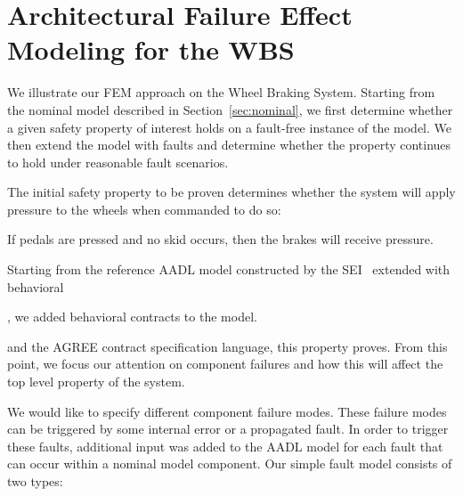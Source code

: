 \section{Architectural Failure Effect Modeling for the WBS}

We illustrate our FEM approach on the Wheel Braking System.  Starting from the nominal model described in Section~\ref{sec:nominal}, we first determine whether a given safety property of interest holds on a fault-free instance of the model.  We then extend the model with faults and determine whether the property continues to hold under reasonable fault scenarios.

The initial safety property to be proven determines whether the system will apply pressure to the wheels when commanded to do so: 

\begin{tt}
If pedals are pressed and no skid occurs, then the brakes will receive pressure. \\
\end{tt}

Starting from the reference AADL model constructed by the SEI~\cite{SEI:AADL} extended with behavioral 

, we added behavioral contracts to the model.


and the AGREE contract specification language, this property proves. From this point, we focus our attention on component failures and how this will affect the top level property of the system.

We would like to specify different component failure modes. These failure modes can be triggered by some internal error or a propagated fault. In order to trigger these faults, additional input was added to the AADL model for each fault that can occur within a nominal model component. Our simple fault model consists of two types:

